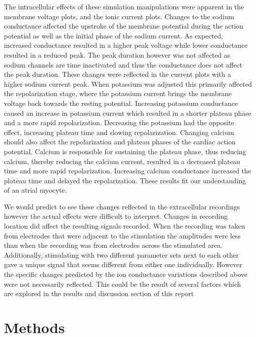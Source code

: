 \documentclass[12pt]{article}
\begin{document}
\par{}
The intracellular effects of these simulation manipulations were apparent in the membrane voltage plots, and the ionic current plots. Changes to the sodium conductance affected the upstroke of the membrane potential during the action potential as well as the initial phase of the sodium current. As expected, increased conductance resulted in a higher peak voltage while lower conductance resulted in a reduced peak. The peak duration however was not affected as sodium channels are time inactivated and thus the conductance does not affect the peak duration. These changes were reflected in the current plots with a higher sodium current peak. When potassium was adjusted this primarily affected the repolarization stage, where the potassium current brings the membrane voltage back towards the resting potential. Increasing potassium conductance caused an increase in potassium current which resulted in a shorter plateau phase and a more rapid repolarization. Decreasing the potassium had the opposite effect, increasing plateau time and slowing repolarization. Changing calcium should also affect the repolarization and plateau phases of the  cardiac action potential. Calcium is responsible for sustaining the plateau phase, thus reducing calcium, thereby reducing the calcium current, resulted in a decreased plateau time and more rapid repolarization. Increasing calcium conductance increased the plateau time and delayed the repolarization. These results fit our understanding of an atrial myocyte.
\par{}
We would predict to see these changes reflected in the extracellular recordings however the actual effects were difficult to interpret. Changes in recording location did affect the resulting signals recorded. When the recording was taken from electrodes that were adjacent to the stimulation the amplitudes were less than when the recording was from electrodes across the stimulated area. Additionally, stimulating with two different parameter sets next to each other gave a unique signal that seems different from either one individually. However the specific changes predicted by the ion conductance variations described above were not necessarily reflected. This could be the result of several factors which are explored in the results and discussion section of this report


\section{Methods}
\end{document}
